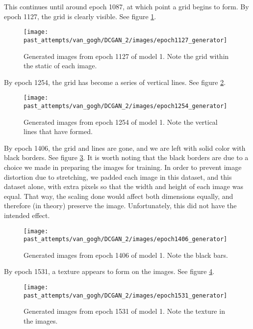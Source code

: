 \documentclass[11pt,letterpaper]{article}
\begin{document}
				This continues until around epoch 1087, at which point a grid begins to form.
				By epoch 1127, the grid is clearly visible.
				See figure \ref{fig:vgm:epoch1127generator}.
				\begin{figure}
					\centering
					\texttt{[image: past\_attempts/van\_gogh/DCGAN\_2/images/epoch1127\_generator]}
					\caption[Van Gogh Museum dataset, epoch 1127]{Generated images from epoch 1127 of model 1. Note the grid within the static of each image.}
					\label{fig:vgm:epoch1127generator}
				\end{figure}

				By epoch 1254, the grid has become a series of vertical lines.
				See figure \ref{fig:vgm:epoch1254generator}.
				\begin{figure}
					\centering
					\texttt{[image: past\_attempts/van\_gogh/DCGAN\_2/images/epoch1254\_generator]}
					\caption[Van Gogh Museum dataset, epoch 1254]{Generated images from epoch 1254 of model 1. Note the vertical lines that have formed.}
					\label{fig:vgm:epoch1254generator}
				\end{figure}

				By epoch 1406, the grid and lines are gone, and we are left with solid color with black borders.
				See figure \ref{fig:vgm:epoch1406generator}.
				It is worth noting that the black borders are due to a choice we made in preparing the images for training.
				In order to prevent image distortion due to stretching, we padded each image in this dataset, and this dataset alone, with extra pixels so that the width and height of each image was equal.
				That way, the scaling done would affect both dimensions equally, and therefore (in theory) preserve the image.
				Unfortunately, this did not have the intended effect.
				\begin{figure}
					\centering
					\texttt{[image: past\_attempts/van\_gogh/DCGAN\_2/images/epoch1406\_generator]}
					\caption[Van Gogh Museum dataset, epoch 1406]{Generated images from epoch 1406 of model 1. Note the black bars.}
					\label{fig:vgm:epoch1406generator}
				\end{figure}

				By epoch 1531, a texture appears to form on the images.
				See figure \ref{fig:vgm:epoch1531generator}.
				\begin{figure}
					\centering
					\texttt{[image: past\_attempts/van\_gogh/DCGAN\_2/images/epoch1531\_generator]}
					\caption[Van Gogh Museum dataset, epoch 1531]{Generated images from epoch 1531 of model 1. Note the texture in the images.}
					\label{fig:vgm:epoch1531generator}
				\end{figure}
\end{document}
